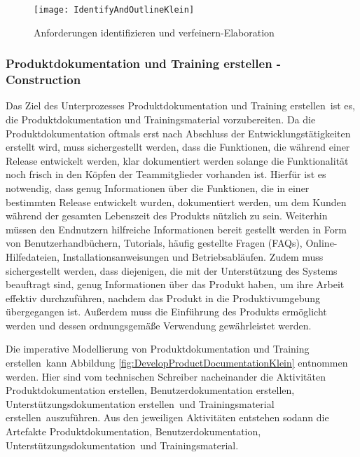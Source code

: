 \begin{figure}[[!htbp]
\begin{center}
  \texttt{[image: IdentifyAndOutlineKlein]} %
  \caption{Anforderungen identifizieren und verfeinern-Elaboration}
  \label{fig:IdentifyAndOutlineKlein}
\end{center}
\end{figure}


\subsubsection{Produktdokumentation und Training erstellen - Construction}
 Das Ziel des Unterprozesses \grqq Produktdokumentation und Training erstellen\grqq \ ist es, die Produktdokumentation und Trainingsmaterial vorzubereiten. Da die Produktdokumentation oftmals erst nach Abschluss der Entwicklungstätigkeiten erstellt wird, muss sichergestellt werden, dass die Funktionen, die während einer Release entwickelt werden, klar dokumentiert werden solange die Funktionalität noch frisch in den Köpfen der Teammitglieder vorhanden ist.\newline
 Hierfür ist es notwendig, dass genug Informationen über die Funktionen, die in einer bestimmten Release entwickelt wurden, dokumentiert werden, um dem Kunden während der gesamten Lebenszeit des Produkts nützlich zu sein.\newline
 Weiterhin müssen den Endnutzern hilfreiche Informationen bereit gestellt werden in Form von Benutzerhandbüchern, Tutorials, häufig gestellte Fragen (FAQs), Online-Hilfedateien, Installationsanweisungen und Betriebsabläufen. 
 Zudem muss sichergestellt werden, dass diejenigen, die mit der Unterstützung des Systems beauftragt sind, genug Informationen über das Produkt haben, um ihre Arbeit effektiv durchzuführen, nachdem das Produkt in die Produktivumgebung übergegangen ist. Außerdem muss die Einführung des Produkts ermöglicht werden und dessen ordnungsgemäße Verwendung gewährleistet werden.\newline
 
 Die imperative Modellierung von \grqq Produktdokumentation und Training erstellen\grqq \ kann Abbildung \ref{fig:DevelopProductDocumentationKlein} entnommen werden.
 Hier sind vom technischen Schreiber nacheinander die Aktivitäten \grqq Produktdokumentation erstellen\grqq, \grqq Benutzerdokumentation erstellen\grqq, \grqq Unterstützungsdokumentation erstellen\grqq \ und \grqq Trainingsmaterial erstellen\grqq \ auszuführen. Aus den jeweiligen Aktivitäten entstehen sodann die Artefakte \grqq Produktdokumentation\grqq, \grqq Benutzerdokumentation\grqq, \grqq Unterstützungsdokumentation\grqq \ und \grqq Trainingsmaterial\grqq.
 
